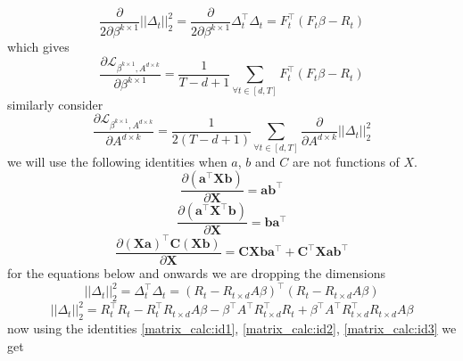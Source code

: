 \begin{equation}
    \frac{\partial}{2\partial \beta^{k \times 1}} ||\Delta_t||_2^2 =  \frac{\partial}{2\partial \beta^{k \times 1}} \Delta_t^\top \Delta_t = F_t^\top (F_t \beta - R_t)
\end{equation}
\newline which gives
\begin{equation}\label{Loss_diff_wrt_beta}
    \frac{\partial \mathcal{L}_{\beta^{k \times 1}, A^{d\times k}}}{\partial \beta^{k \times 1}} = \frac{1}{T-d+1} \sum_{\forall t\in [d,T]} F_t^\top (F_t \beta - R_t)
\end{equation}
\newline similarly consider 
\begin{equation}
    \frac{\partial \mathcal{L}_{\beta^{k \times 1}, A^{d\times k}}}{\partial A^{d \times k}} = \frac{1}{2(T-d+1)} \sum_{\forall t\in [d,T]} \frac{\partial}{\partial A^{d \times k}} ||\Delta_t||_2^2 
\end{equation}
we will use the following identities when $a$, $b$ and $C$ are not functions of $X$.
\begin{equation} \label{matrix_calc:id1}
\frac{\partial (\mathbf{a}^\top \mathbf{X} \mathbf{b})}{\partial \mathbf{X}} = \mathbf{a} \mathbf{b}^\top
\end{equation}
\begin{equation}\label{matrix_calc:id2}
\frac{\partial (\mathbf{a}^\top \mathbf{X}^\top \mathbf{b})}{\partial \mathbf{X}} = \mathbf{b} \mathbf{a}^\top
\end{equation}
\begin{equation}\label{matrix_calc:id3}
\frac{\partial (\mathbf{X} \mathbf{a})^\top \mathbf{C} (\mathbf{X} \mathbf{b})}{\partial \mathbf{X}} = \mathbf{C} \mathbf{X} \mathbf{b} \mathbf{a}^\top + \mathbf{C}^\top \mathbf{X} \mathbf{a} \mathbf{b}^\top
\end{equation}
\newline for the equations below and onwards we are dropping the dimensions
\begin{equation}
    ||\Delta_t||_2^2 = \Delta_t^\top \Delta_t = (R_t-R_{t\times d} A  \beta)^\top (R_t-R_{t\times d} A \beta)
\end{equation}
\begin{equation}
    ||\Delta_t||_2^2 = R_t^\top R_t - R_t^\top R_{t\times d} A \beta - \beta^\top A^\top  R_{t\times d}^\top R_t+ \beta^\top A^\top  R_{t\times d}^\top R_{t\times d} A \beta
\end{equation}
\newline now using the identities \ref{matrix_calc:id1}, \ref{matrix_calc:id2}, \ref{matrix_calc:id3} we get 

